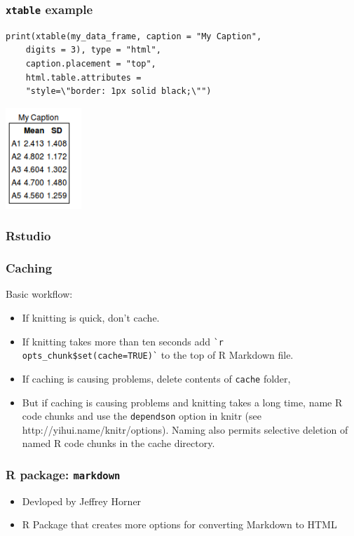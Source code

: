\begin{frame}[fragile]\frametitle{\texttt{xtable} example}

\begin{verbatim}
print(xtable(my_data_frame, caption = "My Caption", 
    digits = 3), type = "html", 
    caption.placement = "top", 
    html.table.attributes = 
    "style=\"border: 1px solid black;\"")
\end{verbatim}

\centerline{\includegraphics[height=1.5in]{figures/simple_table.png}}

\end{frame}

\begin{frame}\frametitle{Rstudio}

\end{frame}

\begin{frame}[fragile]\frametitle{Caching}

Basic workflow:

\begin{itemize}
\item
  If knitting is quick, don't cache.
\item
  If knitting takes more than ten seconds add
  \texttt{\`}\texttt{r opts\_chunk\$set(cache=TRUE)}\texttt{\`} to the
  top of R Markdown file.
\item
  If caching is causing problems, delete contents of \texttt{cache}
  folder,
\item
  But if caching is causing problems and knitting takes a long time,
  name R code chunks and use the \texttt{dependson} option in knitr (see
  http://yihui.name/knitr/options). Naming also permits selective
  deletion of named R code chunks in the cache directory.
\end{itemize}

\end{frame}

\begin{frame}\frametitle{R package: \texttt{markdown}}

\begin{itemize}
\item
  Devloped by Jeffrey Horner
\item
  R Package that creates more options for converting Markdown to HTML
\end{itemize}

\end{frame}

